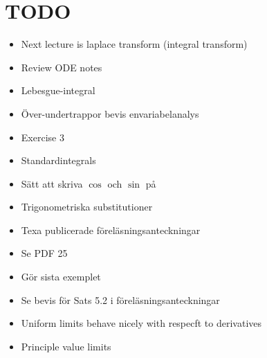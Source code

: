 \section{TODO}\par
\begin{itemize}
  \item Next lecture is laplace transform (integral transform) 
  \item Review ODE notes
  \item Lebesgue-integral
  \item Över-undertrappor bevis envariabelanalys
  \item Exercise 3
  \item Standardintegrals
  \item Sätt att skriva $\cos$ och $\sin$ på
  \item Trigonometriska substitutioner
  \item Texa publicerade föreläsningsanteckningar 
  \item Se PDF 25
  \item Gör sista exemplet
  \item Se bevis för Sats 5.2 i föreläsningsanteckningar
  \item Uniform limits behave nicely with respecft to derivatives
  \item Principle value limits
\end{itemize}
